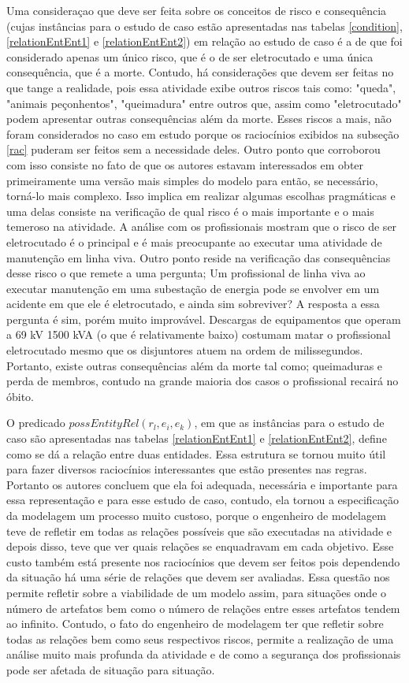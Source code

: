 Uma consideraçao que deve ser feita sobre os conceitos de risco e consequência (cujas instâncias para o estudo de caso estão apresentadas nas tabelas \ref{condition}, \ref{relationEntEnt1} e \ref{relationEntEnt2}) em relação ao estudo de caso é a de que foi considerado apenas um único risco, que é o de ser eletrocutado e uma única consequência, que é a morte. Contudo, há considerações que devem ser feitas no que tange a realidade, pois essa atividade exibe outros riscos tais como: "queda", "animais peçonhentos", "queimadura" entre outros que, assim como "eletrocutado" podem apresentar outras consequências além da morte. Esses riscos a mais, não foram considerados no caso em estudo porque os raciocínios exibidos na subseção \ref{rac} puderam ser feitos sem a necessidade deles. Outro ponto que corroborou com isso consiste no fato de que os autores estavam interessados em obter primeiramente uma versão mais simples do modelo para então, se necessário, torná-lo mais complexo. Isso implica em realizar algumas escolhas pragmáticas e uma delas consiste na verificação de qual risco é o mais importante e o mais temeroso na atividade. A análise com os profissionais mostram que o risco de ser eletrocutado é o principal e é mais preocupante ao executar uma atividade de manutenção em linha viva. Outro ponto reside na verificação das consequências desse risco o que remete a uma pergunta; Um profissional de linha viva ao executar manutenção em uma subestação de energia pode se envolver em um acidente em que ele é eletrocutado, e ainda sim sobreviver? A resposta a essa pergunta é sim, porém muito improvável. Descargas de equipamentos que operam a 69 kV 1500 kVA  (o que é relativamente baixo) costumam matar o profissional eletrocutado mesmo que os disjuntores atuem na ordem de milissegundos. Portanto, existe outras consequências além da morte tal como; queimaduras e perda de membros, contudo na grande maioria dos casos o profissional recairá no óbito. 

O predicado $possEntityRel(r_l,e_i,e_k)$, em que as instâncias para o estudo de caso são apresentadas nas tabelas \ref{relationEntEnt1} e \ref{relationEntEnt2}, define como se dá a relação entre duas entidades. Essa estrutura se tornou muito útil para fazer diversos raciocínios interessantes que estão presentes nas regras. Portanto os autores concluem que ela foi adequada, necessária e importante para essa representação e para esse estudo de caso, contudo, ela tornou a especificação da modelagem um processo muito custoso, porque o engenheiro de modelagem teve de refletir em todas as relações possíveis que são executadas na atividade e depois disso, teve que ver quais relações se enquadravam em cada objetivo. Esse custo também está presente nos raciocínios que devem ser feitos pois dependendo da situação há uma série de relações que devem ser avaliadas. Essa questão nos permite refletir sobre a viabilidade de um modelo assim, para situações onde o número de artefatos bem como o número de relações entre esses artefatos tendem ao infinito. Contudo, o fato do engenheiro de modelagem ter que refletir sobre todas as relações bem como seus respectivos riscos, permite a realização de uma análise muito mais profunda da atividade e de como a segurança dos profissionais pode ser afetada de situação para situação. 

